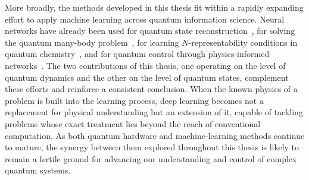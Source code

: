 More broadly, the methods developed in this thesis fit within a rapidly expanding effort to apply machine learning across quantum information science. Neural networks have already been used for quantum state reconstruction~\cite{danaci2021, barzili2021}, for solving the quantum many-body problem~\cite{carleo2017, carleo2019, huang2022provably, requena2023}, for learning $N$-representability conditions in quantum chemistry~\cite{sagersmith2022, delgadogranados2025, shao2023}, and for quantum control through physics-informed networks~\cite{norambuena2024}. The two contributions of this thesis, one operating on the level of quantum dynamics and the other on the level of quantum states, complement these efforts and reinforce a consistent conclusion. When the known physics of a problem is built into the learning process, deep learning becomes not a replacement for physical understanding but an extension of it, capable of tackling problems whose exact treatment lies beyond the reach of conventional computation. As both quantum hardware and machine-learning methods continue to mature, the synergy between them explored throughout this thesis is likely to remain a fertile ground for advancing our understanding and control of complex quantum systems.
